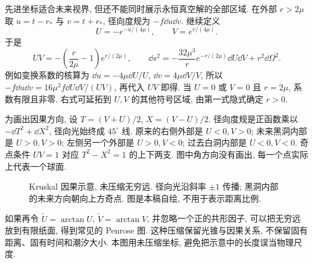 先进坐标适合未来视界, 但还不能同时展示永恒真空解的全部区域. 在外部 $r>2\mu$ 取 $u=t-r_*$ 与 $v=t+r_*$, 径向度规为 $-f\dd u\dd v$. 继续定义
\begin{equation}
 U=-e^{-u/(4\mu)},\qquad V=e^{v/(4\mu)}.
 \label{eq:gr-kruskal-transform}
\end{equation}
于是
\begin{equation}
 UV=-\left(\frac r{2\mu}-1\right)e^{r/(2\mu)},\qquad
 \dd s^2=-\frac{32\mu^3}{r}e^{-r/(2\mu)}\dd U\dd V+r^2\dd\Omega^2.
 \label{eq:gr-kruskal-metric}
\end{equation}
例如变换系数的核算为 $\dd u=-4\mu\dd U/U$, $\dd v=4\mu\dd V/V$, 所以 $-f\dd u\dd v=16\mu^2 f\dd U\dd V/(UV)$, 再代入 $UV$ 即得. 当 $U=0$ 或 $V=0$ 且 $r=2\mu$, 系数有限且非零. 右式可延拓到 $U,V$ 的其他符号区域, 由第一式隐式确定 $r>0$.

为画出因果方向, 设 $T=(V+U)/2$, $X=(V-U)/2$. 径向度规是正函数乘以 $-\dd T^2+\dd X^2$, 径向光始终成 $45^\circ$ 线. 原来的右侧外部是 $U<0,V>0$; 未来黑洞内部是 $U>0,V>0$; 左侧另一个外部是 $U>0,V<0$; 过去白洞内部是 $U<0,V<0$. 奇点条件 $UV=1$ 对应 $T^2-X^2=1$ 的上下两支. 图中角方向没有画出, 每一个点实际上代表一个球面.

\begin{figure}[htbp]
\centering
{}
\caption{Kruskal 因果示意, 未压缩无穷远. 径向光沿斜率 $\pm1$ 传播; 黑洞内部的未来方向朝向上方奇点. 图是本稿自绘, 不用于表示距离比例.}
\label{fig:gr-kruskal}
\end{figure}

如果再令 $\widetilde U=\arctan U$, $\widetilde V=\arctan V$, 并忽略一个正的共形因子, 可以把无穷远放到有限纸面, 得到常见的 Penrose 图. 这种压缩保留光锥与因果关系, 不保留固有距离、固有时间和潮汐大小. 本图用未压缩坐标, 避免把示意中的长度误当物理尺度.

